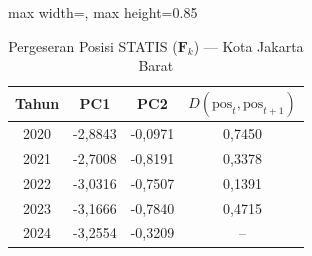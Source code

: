 \begin{table}[H]
\centering
\caption{Pergeseran Posisi STATIS ($\mathbf{F}_k$) --- Kota Jakarta Barat} \label{tab:app2jarak_statis_skor_kota_jakarta_barat}
\begin{adjustbox}{max width=\textwidth, max height=0.85\textheight}
\begin{tabular}{|c|c|c|c|}
\hline
\textbf{Tahun} & \textbf{PC1} & \textbf{PC2} & \textbf{$D(\text{pos}_t, \text{pos}_{t+1})$} \\
\hline
2020 & -2,8843 & -0,0971 & 0,7450 \\
2021 & -2,7008 & -0,8191 & 0,3378 \\
2022 & -3,0316 & -0,7507 & 0,1391 \\
2023 & -3,1666 & -0,7840 & 0,4715 \\
2024 & -3,2554 & -0,3209 & -- \\
\hline
\end{tabular}
\end{adjustbox}
\end{table}